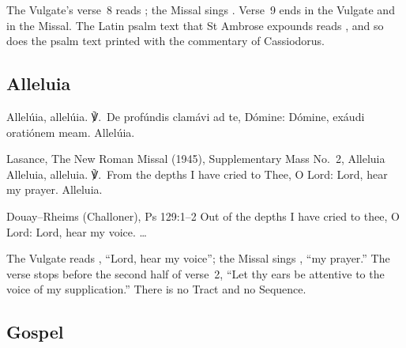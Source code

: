 \noindent The Vulgate's verse~8 reads ; the Missal sings . Verse~9
ends  in the Vulgate and  in the Missal.
The Latin psalm text that St Ambrose expounds reads , and so does the psalm text printed with the
commentary of Cassiodorus.

\subsection{Alleluia}
\label{proper-alleluia}


\begin{latinproper}
Allelúia, allelúia. ℣.~De profúndis clamávi ad te, Dómine: Dómine, exáudi
oratiónem meam. Allelúia.
\end{latinproper}

\begin{englishwitness}{Lasance, The New Roman Missal (1945), Supplementary Mass No.~2, Alleluia}
Alleluia, alleluia. ℣.~From the depths I have cried to Thee, O Lord: Lord,
hear my prayer. Alleluia.
\end{englishwitness}

\begin{englishwitness}{Douay--Rheims (Challoner), Ps 129:1--2}
Out of the depths I have cried to thee, O Lord: Lord, hear my voice. \dots
\end{englishwitness}

\noindent The Vulgate reads , ``Lord, hear my
voice''; the Missal sings , ``my prayer.'' The verse
stops before the second half of verse~2, ``Let thy ears be attentive to the
voice of my supplication.'' There is no Tract and no Sequence.

\subsection{Gospel}
\label{proper-gospel}


